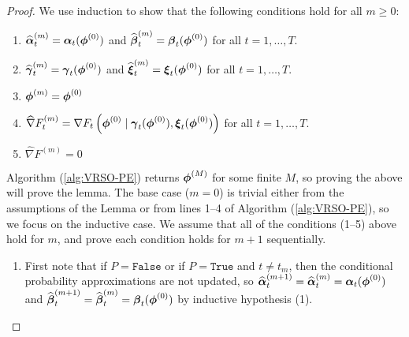 \begin{proof}

    We use induction to show that the following conditions hold for all $m \geq 0$:

    \begin{enumerate}
        \item $\widehat {\boldsymbol{\alpha}}^{(m)}_t = \boldsymbol{\alpha}_t(\boldsymbol{\phi}^{(0)})$ and $\widehat {\boldsymbol{\beta}}^{(m)}_{t} = \boldsymbol{\beta}_t(\boldsymbol{\phi}^{(0)})$ for all $t = 1,\ldots,T$.
        \item $\widehat {\boldsymbol{\gamma}}^{(m)}_{t} = \boldsymbol{\gamma}_t(\boldsymbol{\phi}^{(0)})$ and $\widehat {\boldsymbol{\xi}}^{(m)}_{t} = \boldsymbol{\xi}_t(\boldsymbol{\phi}^{(0)})$ for all $t = 1,\ldots,T$.
        \item $\boldsymbol{\phi}^{(m)} = \boldsymbol{\phi}^{(0)}$
        \item $\widehat \nabla F^{(m)}_{t} = \nabla F_t\left(\boldsymbol{\phi}^{(0)} \mid \boldsymbol{\gamma}_t(\boldsymbol{\phi}^{(0)}),\boldsymbol{\xi}_t(\boldsymbol{\phi}^{(0)})\right)$ for all $t = 1,\ldots,T$.
        \item $\widehat \nabla F^{(m)} = 0$
    \end{enumerate}

    Algorithm (\ref{alg:VRSO-PE}) returns $\boldsymbol{\phi}^{(M)}$ for some finite $M$, so proving the above will prove the lemma. 
    The base case ($m=0$) is trivial either from the assumptions of the Lemma or from lines 1--4 of Algorithm (\ref{alg:VRSO-PE}), so we focus on the inductive case. We assume that all of the conditions (1--5) above hold for $m$, and prove each condition holds for $m+1$ sequentially.

    \begin{enumerate}
        \item First note that if $P = \texttt{False}$ or if $P = \texttt{True}$ and $t \neq t_m$, then the conditional probability approximations are not updated, so $\widehat {\boldsymbol{\alpha}}^{(m+1)}_t = \widehat {\boldsymbol{\alpha}}^{(m)}_t  = \boldsymbol{\alpha}_t(\boldsymbol{\phi}^{(0)})$ and $\widehat {\boldsymbol{\beta}}^{(m+1)}_t = \widehat {\boldsymbol{\beta}}^{(m)}_t = \boldsymbol{\beta}_t(\boldsymbol{\phi}^{(0)})$ by inductive hypothesis (1).
        

\end{enumerate}
\end{proof}
